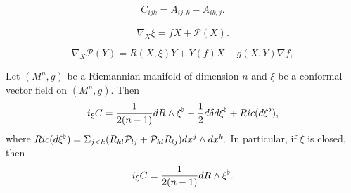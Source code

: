 \documentclass[10pt,a4paper]{amsart}
\begin{document}
                \begin{eqnarray}\label{Cotton}
                        C_{ijk}=A_{ij,k}-A_{ik,j}.
                \end{eqnarray}

         \begin{equation}\label{dfa}\nabla_X\xi=fX+\mathcal{P}(X). \end{equation}

         \begin{equation}\label{CovariantofP}
         \nabla_X\mathcal{P}(Y)=R(X,\xi)Y+Y(f)X-g(X,Y)\nabla f,
         \end{equation}

    \begin{Prop}\label{iC}
          Let $(M^n, g)$ be a Riemannian manifold of dimension $n$ and $\xi$ be a conformal vector field on $(M^n, g)$. Then
          $$i_{\xi}{\rm{C}}=\frac{1}{2(n-1)}d{\rm{R}}\wedge \xi^{\flat}-\frac{1}{2}d\delta d\xi^{\flat}+{\rm Ric}(d\xi^{\flat}),$$
          where ${\rm Ric}(d\xi^{\flat})=\Sigma_{j<k}(R_{kl}\mathcal{P}_{lj}+\mathcal{P}_{kl}R_{lj})dx^j\wedge dx^k.$
          In particular, if $\xi$ is closed, then
          $$i_{\xi}{\rm{C}}=\frac{1}{2(n-1)}d{\rm{R}}\wedge \xi^{\flat}.$$
    \end{Prop}
\end{document}
